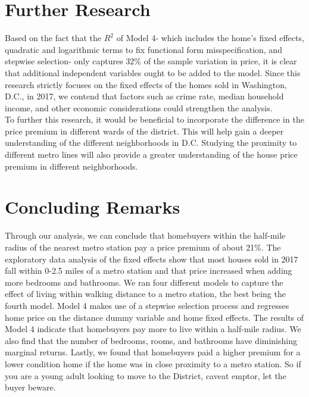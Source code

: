 \documentclass[12pt]{report}
\newcommand\tab[1][.60cm]{\hspace*{#1}}
\begin{document}
\section*{Further Research}

Based on the fact that the $R^2$ of Model 4- which includes the home's fixed effects, quadratic and logarithmic terms to fix functional form misspecification, and stepwise selection- only captures 32\% of the sample variation in price, it is clear that additional independent variables ought to be added to the model. Since this research strictly focuses on the fixed effects of the homes sold in Washington, D.C., in 2017, we contend that factors such as crime rate, median household income, and other economic considerations could strengthen the analysis. \\
\tab To further this research, it would be beneficial to incorporate the difference in the price premium in different wards of the district. This will help gain a deeper understanding of the different neighborhoods in D.C. Studying the proximity to different metro lines will also provide a greater understanding of the house price premium in different neighborhoods. 

\section*{Concluding Remarks}
Through our analysis, we can conclude that homebuyers within the half-mile radius of the nearest metro station pay a price premium of about 21\%. The exploratory data analysis of the fixed effects show that most houses sold in 2017 fall within 0-2.5 miles of a metro station and that price increased when adding more bedrooms and bathrooms. We ran four different models to capture the effect of living within walking distance to a metro station, the best being the fourth model. Model 4 makes use of a stepwise selection process and regresses home price on the distance dummy variable and home fixed effects. The results of Model 4 indicate that homebuyers pay more to live within a half-mile radius.  We also find that the number of bedrooms, rooms, and bathrooms have diminishing marginal returns. Lastly, we found that homebuyers paid a higher premium for a lower condition home if the home was in close proximity to a metro station. So if you are a young adult looking to move to the District, caveat emptor, let the buyer beware. 
\clearpage
\end{document}
